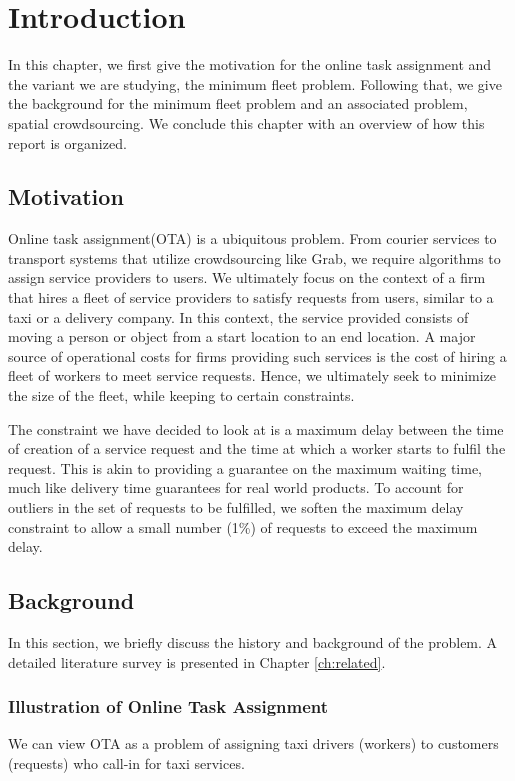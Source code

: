 \documentclass[urop]{socreport}
\begin{document}
\listoffigures 
\listoftables
\tableofcontents 

\chapter{Introduction}
In this chapter, we first give the motivation for the online task assignment and the variant we are studying, the minimum fleet problem. Following that, we give the background for the minimum fleet problem and an associated problem, spatial crowdsourcing. We conclude this chapter with an overview of how this report is organized.

\section{Motivation}
Online task assignment(OTA) is a ubiquitous problem. From courier services to transport systems that utilize crowdsourcing like Grab, we require algorithms to assign service providers to users. We ultimately focus on the context of a firm that hires a fleet of service providers to satisfy requests from users, similar to a taxi or a delivery company. In this context, the service provided consists of moving a person or object from a start location to an end location. A major source of operational costs for firms providing such services is the cost of hiring a fleet of workers to meet service requests. Hence, we ultimately seek to minimize the size of the fleet, while keeping to certain constraints. 

The constraint we have decided to look at is a maximum delay between the time of creation of a service request and the time at which a worker starts to fulfil the request. This is akin to providing a guarantee on the maximum waiting time, much like delivery time guarantees for real world products. To account for outliers in the set of requests to be fulfilled, we soften the maximum delay constraint to allow a small number (1\%) of requests to exceed the maximum delay.

\section{Background}
In this section, we briefly discuss the history and background
of the problem. A detailed literature survey is presented in 
Chapter \ref{ch:related}.

\subsection{Illustration of Online Task Assignment}
We can view OTA as a problem of assigning taxi drivers (workers) to customers (requests) who call-in for taxi services.
\end{document}
